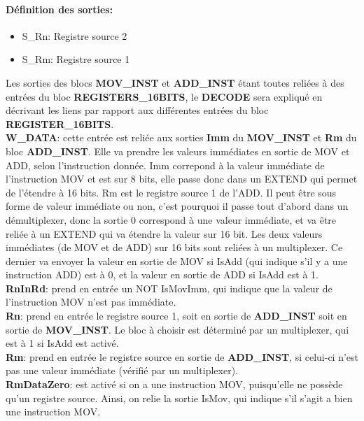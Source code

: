 \documentclass[a4paper]{article} %
\begin{document}
\paragraph{Définition des sorties:}
\begin{itemize}
    \item     S\_Rn: Registre source 2
    \item     S\_Rm: Registre source 1
\end{itemize}
\medskip
Les sorties des blocs \textbf{MOV\_INST} et \textbf{ADD\_INST} étant toutes reliées à des entrées du bloc \textbf{REGISTERS\_16BITS}, le \textbf{DECODE} sera expliqué en décrivant les liens par rapport aux différentes entrées du bloc \textbf{REGISTER\_16BITS}. \medskip \\
\textbf{W\_DATA}: cette entrée est reliée aux sorties \textbf{Imm} du \textbf{MOV\_INST} et \textbf{Rm} du bloc \textbf{ADD\_INST}. Elle va prendre les valeurs immédiates en sortie de MOV et ADD, selon l'instruction donnée. Imm correpond à la valeur immédiate de l'instruction MOV et est sur 8 bits, elle passe donc dans un EXTEND qui permet de l'étendre à 16 bits. Rm est le registre source 1 de l'ADD. Il peut être sous forme de valeur immédiate ou non, c'est pourquoi il passe tout d'abord dans un démultiplexer, donc la sortie 0 correspond à une valeur immédiate, et va être reliée à un EXTEND qui va étendre la valeur sur 16 bit. Les deux valeurs immédiates (de MOV et de ADD) sur 16 bits sont reliées à un multiplexer. Ce dernier va envoyer la valeur en sortie de MOV si IsAdd (qui indique s'il y a une instruction ADD) est à 0, et la valeur en sortie de ADD si IsAdd est à 1. \medskip \\
\textbf{RnInRd}: prend en entrée un NOT IsMovImm, qui indique que la valeur de l'instruction MOV n'est pas immédiate.\medskip \\
\textbf{Rn}: prend en entrée le registre source 1, soit en sortie de \textbf{ADD\_INST} soit en sortie de \textbf{MOV\_INST}. Le bloc à choisir est déterminé par un multiplexer, qui est à 1 si IsAdd est activé.\medskip \\
\textbf{Rm}: prend en entrée le registre source en sortie de \textbf{ADD\_INST}, si celui-ci n'est pas une valeur immédiate (vérifié par un multiplexer).
\medskip \\
\textbf{RmDataZero}: est activé si on a une instruction MOV, puisqu'elle ne possède qu'un registre source. Ainsi, on relie la sortie IsMov, qui indique s'il s'agit a bien une instruction MOV.
\medskip \\
\end{document}
